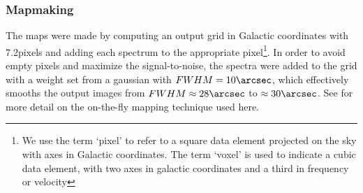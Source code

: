 % 
% 


\subsubsection{Mapmaking}
The maps were made by computing an output grid in Galactic coordinates with
7.2\arcsec pixels and adding each spectrum to the appropriate pixel\footnote{We
use the term `pixel' to refer to a square data element projected on the sky
with axes in Galactic coordinates.  The term `voxel' is used to indicate a cubic data
element, with two axes in galactic coordinates and a third in frequency or
velocity}.  In order
to avoid empty pixels and maximize the signal-to-noise, the spectra were added
to the grid with a weight set from a gaussian with $FWHM=10\arcsec$, which
effectively smooths the output images from $FWHM\approx28\arcsec$ to
$\approx30\arcsec$.  See \citet{Mangum2007a} for more detail on the on-the-fly
mapping technique used here.

